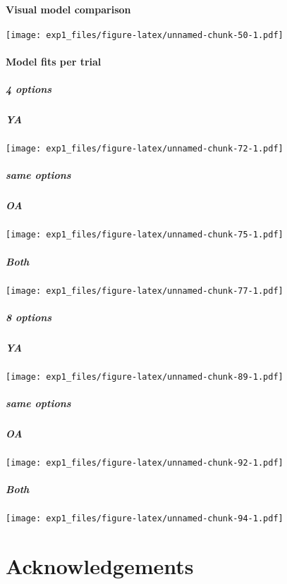 \documentclass[,]{article}
\let\oldparagraph\paragraph
\renewcommand{\paragraph}[1]{\oldparagraph{#1}\mbox{}}
\let\oldsubparagraph\subparagraph
\renewcommand{\subparagraph}[1]{\oldsubparagraph{#1}\mbox{}}
\begin{document}
\newpage

\paragraph{Visual model comparison}\label{visual-model-comparison}

\texttt{[image: exp1\_files/figure-latex/unnamed-chunk-50-1.pdf]}

\newpage

\paragraph{Model fits per trial}\label{model-fits-per-trial}

\subparagraph{4 options}\label{options}

\subparagraph{YA}\label{ya}

\texttt{[image: exp1\_files/figure-latex/unnamed-chunk-72-1.pdf]}

\newpage

\subparagraph{same options}\label{same-options}

\subparagraph{OA}\label{oa}

\texttt{[image: exp1\_files/figure-latex/unnamed-chunk-75-1.pdf]}

\newpage

\subparagraph{Both}\label{both}

\texttt{[image: exp1\_files/figure-latex/unnamed-chunk-77-1.pdf]}

\newpage 

\subparagraph{8 options}\label{options-1}

\subparagraph{YA}\label{ya-1}

\texttt{[image: exp1\_files/figure-latex/unnamed-chunk-89-1.pdf]}

\newpage

\subparagraph{same options}\label{same-options-1}

\subparagraph{OA}\label{oa-1}

\texttt{[image: exp1\_files/figure-latex/unnamed-chunk-92-1.pdf]}

\newpage

\subparagraph{Both}\label{both-1}

\texttt{[image: exp1\_files/figure-latex/unnamed-chunk-94-1.pdf]}

\newpage

\newpage

\section{Acknowledgements}\label{acknowledgements}
\end{document}
